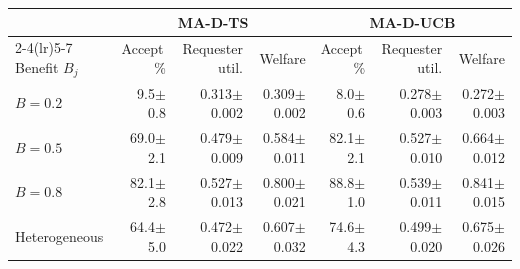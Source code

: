 \begin{tabular}{lrrrrrr}
\toprule
 & \multicolumn{3}{c}{MA-D-TS} & \multicolumn{3}{c}{MA-D-UCB} \\
\cmidrule(lr){2-4}\cmidrule(lr){5-7}
Benefit $B_j$ & Accept\,\% & Requester util. & Welfare & Accept\,\% & Requester util. & Welfare \\
\midrule
$B=0.2$ & 9.5{\scriptsize$\pm$0.8} & 0.313{\scriptsize$\pm$0.002} & 0.309{\scriptsize$\pm$0.002} & 8.0{\scriptsize$\pm$0.6} & 0.278{\scriptsize$\pm$0.003} & 0.272{\scriptsize$\pm$0.003} \\
$B=0.5$ & 69.0{\scriptsize$\pm$2.1} & 0.479{\scriptsize$\pm$0.009} & 0.584{\scriptsize$\pm$0.011} & 82.1{\scriptsize$\pm$2.1} & 0.527{\scriptsize$\pm$0.010} & 0.664{\scriptsize$\pm$0.012} \\
$B=0.8$ & 82.1{\scriptsize$\pm$2.8} & 0.527{\scriptsize$\pm$0.013} & 0.800{\scriptsize$\pm$0.021} & 88.8{\scriptsize$\pm$1.0} & 0.539{\scriptsize$\pm$0.011} & 0.841{\scriptsize$\pm$0.015} \\
Heterogeneous & 64.4{\scriptsize$\pm$5.0} & 0.472{\scriptsize$\pm$0.022} & 0.607{\scriptsize$\pm$0.032} & 74.6{\scriptsize$\pm$4.3} & 0.499{\scriptsize$\pm$0.020} & 0.675{\scriptsize$\pm$0.026} \\
\bottomrule
\end{tabular}
